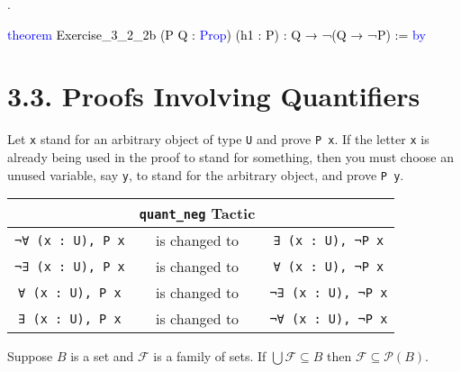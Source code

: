 \documentclass[
  letterpaper,
]{scrreprt}
\makeatletter
\newenvironment{Shaded}{\begin{snugshade}}{\end{snugshade}}
\newcommand{\KeywordTok}[1]{\textcolor[rgb]{0.00,0.23,0.31}{#1}}
\newcommand{\NormalTok}[1]{\textcolor[rgb]{0.00,0.23,0.31}{#1}}
\newcommand{\SpecialCharTok}[1]{\textcolor[rgb]{0.37,0.37,0.37}{#1}}
\newcommand{\WarningTok}[1]{\textcolor[rgb]{0.37,0.37,0.37}{\textit{#1}}}
\def\redsquiggly{\bgroup \markoverwith{\textcolor{red}{\lower3.5\p@\hbox{\sixly \char58}}}\ULon}
\renewcommand{\NormalTok}[1]{\textcolor[HTML]{000000}{#1}}
\renewcommand{\KeywordTok}[1]{\textcolor[HTML]{0000FF}{#1}}
\renewcommand{\SpecialCharTok}[1]{}
\renewcommand{\WarningTok}[1]{\redsquiggly{\textcolor[HTML]{0000FF}{#1}}}
\newenvironment{ind}
	{\begin{list}{}{\setlength{\leftmargin}{1em}}\item\relax}
	{\end{list}}
\newcommand{\nobreakShaded}{\renewenvironment{Shaded}
	{\begin{tcolorbox}[frame hidden, enhanced, interior hidden, boxrule=0pt,
		borderline west={3pt}{0pt}{shadecolor}, sharp corners]}
	{\end{tcolorbox}}}
\newenvironment{numex}[1]
	{\begin{minipage}[t]{0.04\textwidth}\vspace{8pt}{#1}.
		\end{minipage}\nobreakShaded\begin{minipage}[t]{0.96\textwidth}\vspace{0pt}}
	{\end{minipage}}
\theoremstyle{remark}
\makeatother
\begin{document}
\begin{numex}{4}

\begin{Shaded}
\begin{Highlighting}[]
\KeywordTok{theorem}\NormalTok{ Exercise\_3\_2\_2b (P Q : }\KeywordTok{Prop}\NormalTok{)}
\NormalTok{    (h1 : P) : Q → ¬(Q → ¬P) := }\KeywordTok{by}
  
  \SpecialCharTok{**}\WarningTok{done}\SpecialCharTok{::}
\end{Highlighting}
\end{Shaded}

\end{numex}

\hypertarget{proofs-involving-quantifiers}{%
\section{3.3. Proofs Involving
Quantifiers}\label{proofs-involving-quantifiers}}

\begin{ind}
Let \texttt{x} stand for an arbitrary object of type \texttt{U} and
prove \texttt{P\ x}. If the letter \texttt{x} is already being used in
the proof to stand for something, then you must choose an unused
variable, say \texttt{y}, to stand for the arbitrary object, and prove
\texttt{P\ y}.

\end{ind}

\begin{longtable}[]{@{}ccc@{}}
\toprule\noalign{}
& \texttt{quant\_neg} Tactic & \\
\midrule\noalign{}
\endhead
\bottomrule\noalign{}
\endlastfoot
\texttt{¬∀\ (x\ :\ U),\ P\ x} & is changed to &
\texttt{∃\ (x\ :\ U),\ ¬P\ x} \\
\texttt{¬∃\ (x\ :\ U),\ P\ x} & is changed to &
\texttt{∀\ (x\ :\ U),\ ¬P\ x} \\
\texttt{∀\ (x\ :\ U),\ P\ x} & is changed to &
\texttt{¬∃\ (x\ :\ U),\ ¬P\ x} \\
\texttt{∃\ (x\ :\ U),\ P\ x} & is changed to &
\texttt{¬∀\ (x\ :\ U),\ ¬P\ x} \\
\end{longtable}

\begin{thm}
Suppose \(B\) is a set and \(\mathcal{F}\) is a family of sets. If
\(\bigcup\mathcal{F} \subseteq B\) then
\(\mathcal{F} \subseteq \mathscr{P}(B)\).

\end{thm}
\end{document}
